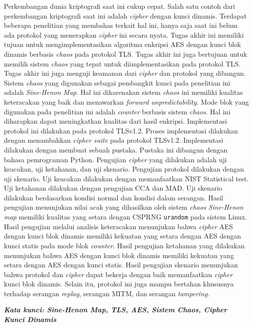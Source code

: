 \begin{singlespace}
  Perkembangan dunia kriptografi saat ini cukup cepat. Salah satu contoh dari perkembangan kriptografi saat ini adalah \emph{cipher} dengan kunci dinamis. Terdapat beberapa penelitian yang membahas terkait hal ini, hanya saja saat ini belum ada protokol yang menerapkan \emph{cipher} ini secara nyata. Tugas akhir ini memiliki tujuan untuk mengimplementasikan algoritma enkripsi AES dengan kunci blok dinamis berbasis \emph{chaos} pada protokol TLS. Tugas akhir ini juga bertujuan untuk memilih sistem \emph{chaos} yang tepat untuk diimplementasikan pada protokol TLS. Tugas akhir ini juga menguji keamanan dari \emph{cipher} dan protokol yang dibangun. Sistem \emph{chaos} yang digunakan sebagai pembangkit kunci pada penelitian ini adalah \emph{Sine-Henon Map}. Hal ini dikarenakan sistem \emph{chaos} ini memiliki kualitas keteracakan yang baik dan menawarkan \emph{forward unpredictability}. Mode blok yang digunakan pada penelitian ini adalah \emph{counter} berbasis sistem \emph{chaos}. Hal ini diharapkan dapat meningkatkan kualitas dari hasil enkripsi. Implementasi protokol ini dilakukan pada protokol TLSv1.2. Proses implementasi dilakukan dengan menambahkan \emph{cipher suite} pada protokol TLSv1.2. Implementasi dilakukan dengan membuat sebuah pustaka. Pustaka ini dibangun dengan bahasa pemrograman Python. Pengujian  \emph{cipher} yang dilakukan adalah uji keacakan, uji ketahanan, dan uji skenario. Pengujian protokol dilakukan dengan uji skenario. Uji keacakan dilakukan dengan memanfaatkan NIST Statistical test. Uji ketahanan dilakukan dengan pengujian CCA dan MAD. Uji skenario dilakukan berdasarkan kondisi normal dan kondisi dalam serangan. Hasil pengujian menunjukan nilai acak yang dihasilkan oleh sistem \emph{chaos Sine-Henon map} memiliki kualitas yang setara dengan CSPRNG \texttt{urandom} pada sistem Linux. Hasil pengujian melalui analisis keteracakan menunjukan bahwa \emph{cipher} AES dengan kunci blok dinamis memiliki kekuatan yang setara dengan AES dengan kunci statis pada mode blok \emph{counter}. Hasil pengujian ketahanan yang dilakukan menunjukan bahwa AES dengan kunci blok dinamis memiliki kekuatan yang setara dengan AES dengan kunci statis. Hasil pengujian skenario  menunjukan bahwa protokol dan \emph{cipher} dapat bekerja dengan baik memanfaatkan \emph{cipher} kunci blok dinamis. Selain itu, protokol ini juga mampu bertahan khususnya terhadap serangan \emph{replay}, serangan MITM, dan serangan \emph{tampering}.
  
  \textbf{\textit{Kata kunci: Sine-Henon Map, TLS, AES, Sistem Chaos, Cipher Kunci Dinamis}}
\end{singlespace}
\clearpage
